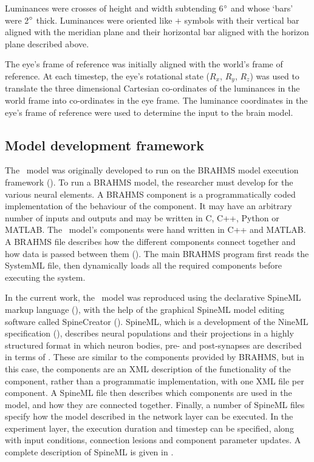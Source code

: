 \documentclass{frontiersSCNS}
\begin{document}
Luminances were crosses of height and width subtending 6$\degree$ and whose
`bars' were 2$\degree$ thick. Luminances were oriented like $+$ symbols with
their vertical bar aligned with the meridian plane and their horizontal bar 
aligned with the horizon plane described above.

The eye's frame of reference was initially aligned with the world's frame
of reference. 
At each timestep, the eye's rotational state ($R_x$, $R_y$, $R_z$) was 
used to translate the three dimensional
Cartesian co-ordinates of the luminances in the world frame into co-ordinates
in the eye frame. The luminance coordinates in the eye's frame of reference
were used to determine the input to the brain model.

\subsection{Model development framework}

The \ccg~model was originally developed to run on the BRAHMS model
execution framework
(\cite{mitchinson_brahms:_2010,mitchinson_brahms_2015}). To run a
BRAHMS model, the researcher must develop  for
the various neural elements. A BRAHMS component is a programmatically
coded implementation of the behaviour of the component. It may have an
arbitrary number of inputs and outputs and may be written in C, C++,
Python or MATLAB. The \ccg~model's components were hand written in C++
and MATLAB. A BRAHMS  file describes how the different
components connect together and how data is passed between them
(\cite{mitchinson_brahms:_2010}). The main BRAHMS program first
reads the SystemML file, then dynamically loads all the required
components before executing the system.

In the current work, the \ccg~model was reproduced using the
declarative SpineML markup language (\cite{richmond_model_2014}),
with the help of the graphical SpineML model editing software
called SpineCreator
(\cite{cope_spinecreator:_2016}). SpineML,
which is a development of the NineML specification
(\cite{incf_task_force_on_multi-scale_modeling_network_2011}),
describes neural populations and their projections in a highly
structured format in which neuron bodies, pre- and post-synapses are
described in terms of . These are similar to the
components provided by BRAHMS, but in this case, the components are an
XML description of the functionality of the component, rather than a
programmatic implementation, with one XML file per component. A
SpineML  file then describes which components are
used in the model, and how they are connected together. Finally, a
number of SpineML  files specify how the model
described in the network layer can be executed. In the experiment
layer, the execution duration and timestep can be specified, along
with input conditions, connection lesions and component parameter
updates. A complete description of SpineML is given
in \cite{richmond_model_2014}.
\end{document}
